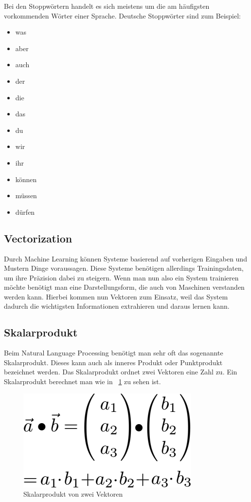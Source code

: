 Bei den Stoppwörtern handelt es sich meistens um die am häufigsten vorkommenden Wörter einer Sprache.
Deutsche Stoppwörter sind zum Beispiel:\cite{germanStopwords}

\begin{itemize}
    \item was
    \item aber
    \item auch
    \item der
    \item die
    \item das
    \item du
    \item wir
    \item ihr
    \item können
    \item müssen
    \item dürfen
\end{itemize}

\subsection{Vectorization}

Durch Machine Learning können Systeme basierend auf vorherigen Eingaben und Mustern Dinge voraussagen.
Diese Systeme benötigen allerdings Trainingsdaten, um ihre Präzision dabei zu steigern.
Wenn man nun also ein System trainieren möchte benötigt man eine Darstellungsform, die auch von Maschinen verstanden werden kann.
Hierbei kommen nun Vektoren zum Einsatz, weil das System dadurch die wichtigsten Informationen extrahieren und daraus lernen kann.

\subsection{Skalarprodukt}

Beim Natural Language Processing benötigt man sehr oft das sogenannte Skalarprodukt. Dieses kann auch als inneres Produkt oder Punktprodukt bezeichnet werden.
Das Skalarprodukt ordnet zwei Vektoren eine Zahl zu.
Ein Skalarprodukt berechnet man wie in ~\ref{fig:dot-product} zu sehen ist.

\begin{figure}[hbt!]
    \centering
    \includegraphics[scale=0.5]{pics/dot-product}
    \caption{Skalarprodukt von zwei Vektoren~\cite{dotProduct}}
    \label{fig:dot-product}
\end{figure}


